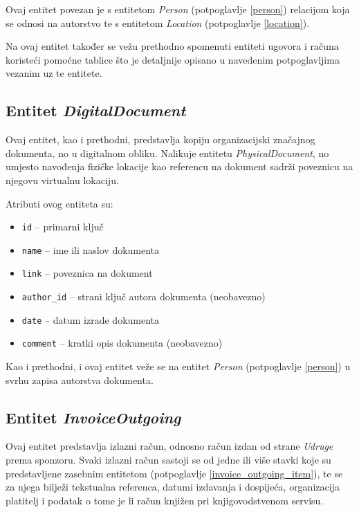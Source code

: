 \documentclass[times, utf8, diplomski]{fer}
\begin{document}
Ovaj entitet povezan je s entitetom \emph{Person} (potpoglavlje \ref{person})
relacijom koja se odnosi na autorstvo te s entitetom \emph{Location}
(potpoglavlje \ref{location}).

Na ovaj entitet također se vežu prethodno spomenuti entiteti ugovora i
računa koristeći pomoćne tablice što je detaljnije opisano u navedenim
potpoglavljima vezanim uz te entitete.

\subsection{Entitet \emph{DigitalDocument}} \label{digital_document}

Ovaj entitet, kao i prethodni, predstavlja kopiju organizacijski značajnog
dokumenta, no u digitalnom obliku. Nalikuje entitetu \emph{PhysicalDocument}, no
umjesto navođenja fizičke lokacije kao referencu na dokument sadrži poveznicu na
njegovu virtualnu lokaciju.

\medskip
Atributi ovog entiteta su:
\begin{itemize}
    \item \texttt{id} -- primarni ključ
    \item \texttt{name} -- ime ili naslov dokumenta
    \item \texttt{link} -- poveznica na dokument
    \item \texttt{author\_id} -- strani ključ autora dokumenta (neobavezno)
    \item \texttt{date} -- datum izrade dokumenta
    \item \texttt{comment} -- kratki opis dokumenta (neobavezno)
\end{itemize}

Kao i prethodni, i ovaj entitet veže se na entitet \emph{Person} (potpoglavlje
\ref{person}) u svrhu zapisa autorstva dokumenta.

\subsection{Entitet \emph{InvoiceOutgoing}} \label{invoice_outgoing}

Ovaj entitet predstavlja izlazni račun, odnosno račun izdan od strane
\emph{Udruge} prema sponzoru. Svaki izlazni račun sastoji se od jedne ili više
stavki koje su predstavljene zasebnim entitetom (potpoglavlje
\ref{invoice_outgoing_item}), te se za njega bilježi tekstualna referenca,
datumi izdavanja i dospijeća, organizacija platitelj i podatak o tome je li
račun knjižen pri knjigovodstvenom servisu.
\end{document}
